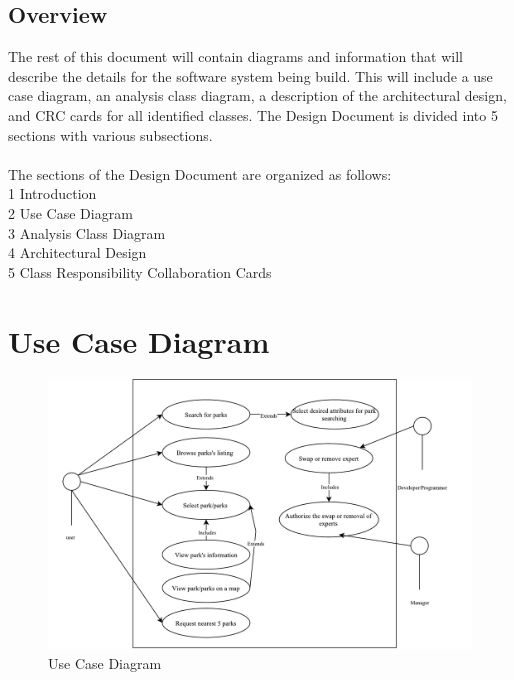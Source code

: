 \documentclass[titlepage]{article}
\begin{document}
\subsection{Overview}
\label{sub:overview}


The rest of this document will contain diagrams and information that will describe the details for the software system being build. This will include a use case diagram, an analysis class diagram, a description of the architectural design, and CRC cards for all identified classes. The Design Document is divided into 5 sections with various subsections. \\
\\
 The sections of the Design Document are organized as follows:\\
 1 Introduction\\
 2 Use Case Diagram\\
 3 Analysis Class Diagram\\
 4 Architectural Design \\
 5 Class Responsibility Collaboration Cards




\section{Use Case Diagram}
\label{sec:use_case_diagram}


\begin{figure}[htbp]
\centerline{\includegraphics[width=1.0\textwidth]{images//UseCase}}
\caption{Use Case Diagram}
\label{useCaseDiagram}
\end{figure}
\end{document}
